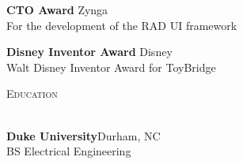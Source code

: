 \documentclass[a4paper]{article}
\newcommand{\lineunder} {
    \vspace*{-8pt} \\
    \hspace*{-18pt} \hrulefill \\
}
\newcommand{\header} [1] {
    {\hspace*{-18pt}\vspace*{6pt} \textsc{#1}}
    \vspace*{-6pt} \lineunder
    \vspace{2mm}
}
\begin{document}
\textbf{CTO Award} \hfill Zynga\\
For the development of the RAD UI framework 
\vspace*{2mm}

\textbf{Disney Inventor Award} \hfill Disney\\
Walt Disney Inventor Award for ToyBridge
\vspace*{4mm}

\header{Education}
\textbf{Duke University}\hfill Durham, NC\\
BS Electrical Engineering\\
\vspace{4mm}
\end{document}

